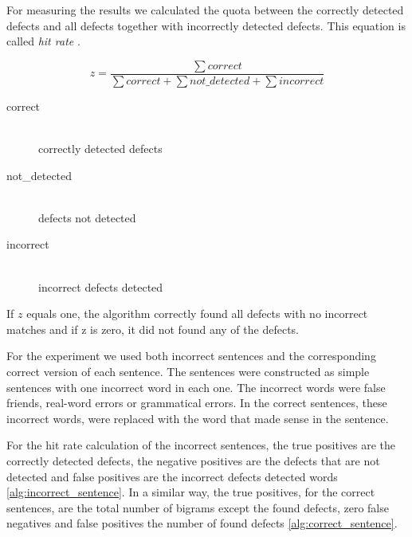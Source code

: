 \documentclass[a4paper,12pt]{article}
\begin{document}
For measuring the results we calculated the quota between the correctly detected defects and all defects together with incorrectly detected defects. This equation is called \emph{hit rate} \cite{ghayoomi2005word}.

$$z = \frac{\sum correct}{\sum correct + \sum not\_detected + \sum incorrect}$$
\begin{description}
  \item[correct] \hfill \\
  		correctly detected defects
  \item[not\_detected] \hfill \\
  		defects not detected
  \item[incorrect] \hfill \\
   		incorrect defects detected
\end{description}

If $z$ equals one, the algorithm correctly found all defects with no incorrect matches and if z is zero, it did not found any of the defects.

For the experiment we used both incorrect sentences and the corresponding correct version of each sentence. The sentences were constructed as simple sentences with one incorrect word in each one. The incorrect words were false friends, real-word errors or grammatical errors. In the correct sentences, these incorrect words, were replaced with the word that made sense in the sentence. 

For the hit rate calculation of the incorrect sentences, the true positives are the correctly detected defects, the negative positives are the defects that are not detected and false positives are the incorrect defects detected words \ref{alg:incorrect_sentence}. In a similar way, the true positives, for the correct sentences, are the total number of bigrams except the found defects, zero false negatives and false positives the number of found defects \ref{alg:correct_sentence}.
 
\end{document}
